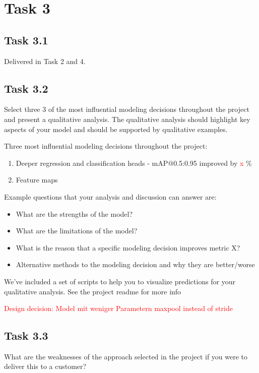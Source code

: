 \documentclass{article}
\begin{document}
\newpage
\section*{Task 3}

\subsection*{Task 3.1}
Delivered in Task 2 and 4.

\subsection*{Task 3.2}
Select three 3 of the most influential modeling decisions throughout the project and present a qualitative analysis. The qualitative analysis should highlight key aspects of your model and should be supported by qualitative
examples.

Three most influential modeling decisions throughout the project:
\begin{enumerate}
    \item Deeper regression and classification heads - mAP@0.5:0.95 improved by \textcolor{red}{x} \%
    \item Feature maps
\end{enumerate}

Example questions that your analysis and discussion can answer are:
\begin{itemize}
    \item What are the strengths of the model?
    \item What are the limitations of the model?
    \item What is the reason that a specific modeling decision improves metric X?
    \item Alternative methods to the modeling decision and why they are better/worse
\end{itemize}

We’ve included a set of scripts to help you to visualize predictions for your qualitative analysis. See the project
readme for more info

\textcolor{red}{Design decision: Model mit weniger Parametern maxpool instead of stride}

\subsection*{Task 3.3}
What are the weaknesses of the approach selected in the project if you were to deliver this to a customer?
\end{document}
